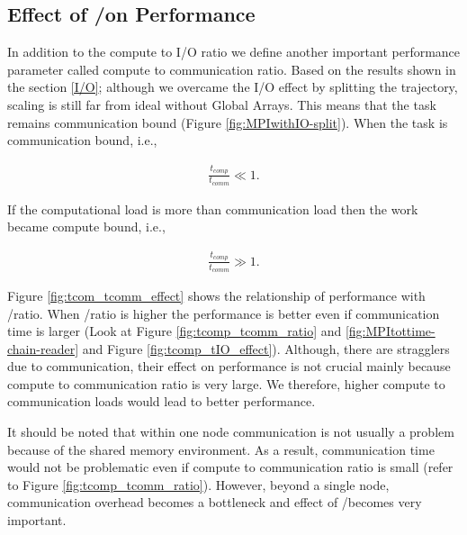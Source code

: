 \subsection{Effect of \tcomp/\tcomm on Performance}
In addition to the compute to I/O ratio we define another important performance parameter called compute to communication ratio.
Based on the results shown in the section \ref{I/O}; although we overcame the I/O effect by splitting the trajectory, scaling is still far from ideal without Global Arrays.
This means that the task remains communication bound (Figure \ref{fig:MPIwithIO-split}). 
When the task is communication bound, i.e.,

\begin{gather*}
  \frac{t_{comp}}{t_{comm}} \ll 1.
\end{gather*}

If the computational load is more than communication load then the work became compute bound, i.e.,

\begin{gather*}
  \frac{t_{comp}}{t_{comm}} \gg 1.
\end{gather*}

Figure \ref{fig:tcom_tcomm_effect} shows the relationship of performance with \tcomp/\tcomm ratio.
When \tcomp/\tcomm ratio is higher the performance is better even if communication time is larger (Look at Figure \ref{fig:tcomp_tcomm_ratio} and \ref{fig:MPItottime-chain-reader} and Figure \ref{fig:tcomp_tIO_effect}).
Although, there are stragglers due to communication, their effect on performance is not crucial mainly because compute to communication ratio is very large. 
We therefore, higher compute to communication loads would lead to better performance. 

It should be noted that within one node communication is not usually a problem because of the shared memory environment. 
As a result, communication time would not be problematic even if compute to communication ratio is small (refer to Figure \ref{fig:tcomp_tcomm_ratio}).
However, beyond a single node, communication overhead becomes a bottleneck and effect of \tcomp/\tcomm becomes very important.

